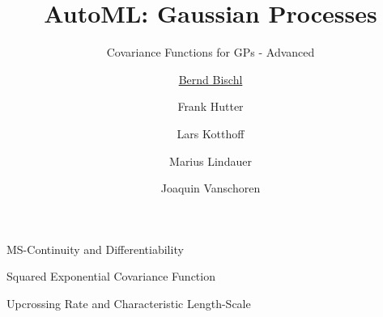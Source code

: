 



\newcommand{\lz}{\vspace{0.5cm}}
\newcommand{\thetab}{\bm{\weights}}
\newcommand{\zero}{\mathbf{0}}
\newcommand{\Xmat}{\mathbf{X}}
\newcommand{\ydat}{\mathbf{y}}
\newcommand{\id}{\boldsymbol{I}}
\newcommand{\Amat}{\mathbf{A}}
\newcommand{\Xspace}{\mathcal{X}}                                           
\newcommand{\Yspace}{\mathcal{Y}}
\newcommand{\ls}{\ell}
\newcommand{\natnum}{\mathbb{N}}
\newcommand{\intnum}{\mathbb{Z}}

\usepackage{fontawesome}
\usepackage{dirtytalk}
\usepackage{csquotes}



\title[AutoML: GPs]{AutoML: Gaussian Processes} %
\subtitle{Covariance Functions for GPs - Advanced} %
\author[Marius Lindauer]{\underline{Bernd Bischl} \and Frank Hutter \and Lars Kotthoff\newline \and Marius Lindauer \and Joaquin Vanschoren}
\institute{}
\date{}




\maketitle
	
\begin{frame}[c,allowframebreaks]{MS-Continuity and Differentiability}






\framebreak






\end{frame}
\begin{frame}[c]{Squared Exponential Covariance Function}






\end{frame}
\begin{frame}[c,allowframebreaks]{Upcrossing Rate and Characteristic Length-Scale}






\framebreak






\end{frame}


